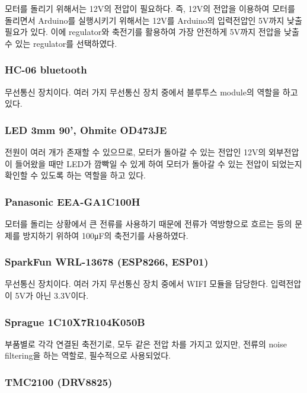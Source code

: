 모터를 돌리기 위해서는 12V의 전압이 필요하다. 즉, 12V의 전압을 이용하여 모터를 돌리면서 Arduino를 실행시키기 위해서는 12V를 Arduino의 입력전압인 5V까지 낮출 필요가 있다. 이에 regulator와 축전기를 활용하여 가장 안전하게 5V까지 전압을 낮출 수 있는 regulator를 선택하였다.

\subsubsection{HC-06 bluetooth}

무선통신 장치이다. 여러 가지 무선통신 장치 중에서 블루투스 module의 역할을 하고 있다.

\subsubsection{LED 3mm 90', Ohmite OD473JE}

전원이 여러 개가 존재할 수 있으므로, 모터가 돌아갈 수 있는 전압인 12V의 외부전압이 들어왔을 때만 LED가 깜빡일 수 있게 하여 모터가 돌아갈 수 있는 전압이 되었는지 확인할 수 있도록 하는 역할을 하고 있다.

\subsubsection{Panasonic EEA-GA1C100H}

모터를 돌리는 상황에서 큰 전류를 사용하기 때문에 전류가 역방향으로 흐르는 등의 문제를 방지하기 위하여 100μF의 축전기를 사용하였다.

\subsubsection{SparkFun WRL-13678 (ESP8266, ESP01)}

무선통신 장치이다. 여러 가지 무선통신 장치 중에서 WIFI 모듈을 담당한다. 입력전압이 5V가 아닌 3.3V이다.

\subsubsection{Sprague 1C10X7R104K050B}

부품별로 각각 연결된 축전기로, 모두 같은 전압 차를 가지고 있지만, 전류의 noise filtering을 하는 역할로, 필수적으로 사용되었다.

\subsubsection{TMC2100 (DRV8825)}

